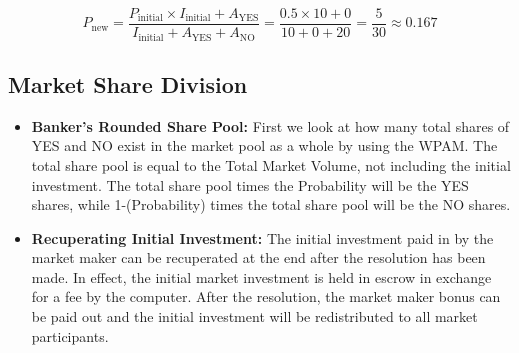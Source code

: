 \documentclass{article}
\newcommand{\piechart}[3]{ %
  \draw (#1,#2) circle (0.5); %
  \pgfmathsetmacro{\startangle}{90}
  \pgfmathsetmacro{\endangle}{90 - 360 * #3} %
  \filldraw[fill=cyan!50] (#1,#2) -- ++(\startangle:0.5) arc (\startangle:\endangle:0.5) -- cycle; %
}
\begin{document}
\begin{center}

\end{center}

\[
P_{\text{new}} = \frac{P_{\text{initial}} \times I_{\text{initial}} + A_{\text{YES}}}{I_{\text{initial}} + A_{\text{YES}} + A_{\text{NO}}} = \frac{0.5 \times 10 + 0}{10 + 0 + 20} = \frac{5}{30} \approx 0.167
\]


\subsection*{Market Share Division}

\begin{itemize}
    \item \textbf{Banker's Rounded Share Pool:} First we look at how many total shares of YES and NO exist in the market pool as a whole by using the WPAM. The total share pool is equal to the Total Market Volume, not including the initial investment. The total share pool times the Probability will be the YES shares, while 1-(Probability) times the total share pool will be the NO shares.
    \item  \textbf{Recuperating Initial Investment:} The initial investment paid in by the market maker can be recuperated at the end after the resolution has been made. In effect, the initial market investment is held in escrow in exchange for a fee by the computer. After the resolution, the market maker bonus can be paid out and the initial investment will be redistributed to all market participants.
\end{itemize}
\end{document}
